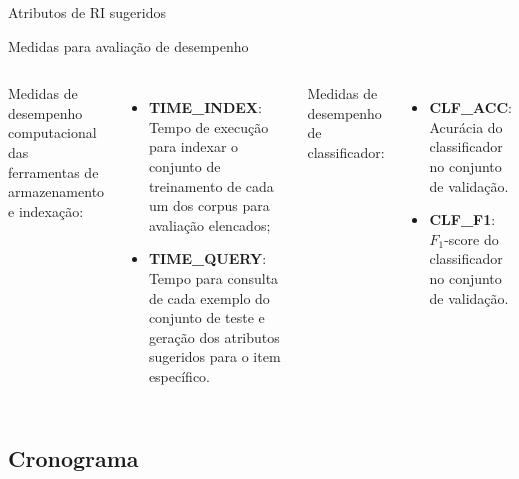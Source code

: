\documentclass[%
  10pt,%
  aspectratio = 169,%
  compress,%
  t,%
]{beamer}%
\begin{document}
    \begin{frame}{}{Atributos de RI sugeridos}
        
    \end{frame}
    
    \begin{frame}{}{Medidas para avaliação de desempenho}
        \vspace{0.2cm}
        \begin{columns}[t]
            Medidas de desempenho computacional das ferramentas de armazenamento e indexação:
            \begin{itemize}
                \item \textbf{TIME\_INDEX}: Tempo de execução para indexar o conjunto de treinamento de cada um dos corpus para avaliação elencados;
                
                \item \textbf{TIME\_QUERY}: Tempo para consulta de cada exemplo do conjunto de teste e geração dos atributos sugeridos para o item específico.  
            \end{itemize}
            
            Medidas de desempenho de classificador:
            \begin{itemize}
                \item \textbf{CLF\_ACC}: Acurácia do classificador no conjunto de validação.
                \item \textbf{CLF\_F1}: $F_1$-score do classificador no conjunto de validação.
            \end{itemize}
        \end{columns}
    \end{frame}

    \subsection{Cronograma}\label{subsec:cronograma}
    \begin{frame}{}{}
        
    \end{frame}
    
\end{document}
